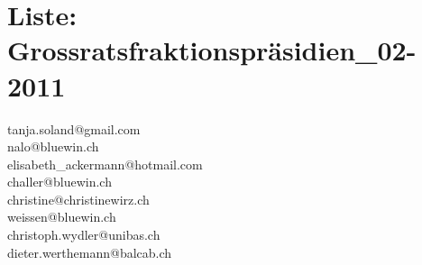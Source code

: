 \documentclass{scrartcl}
\begin{document}
\section*{Liste: Grossratsfraktionspräsidien_02-2011}
\textbf{} tanja.soland@gmail.com\\
\textbf{} nalo@bluewin.ch\\
\textbf{} elisabeth_ackermann@hotmail.com\\
\textbf{} challer@bluewin.ch\\
\textbf{} christine@christinewirz.ch\\
\textbf{} weissen@bluewin.ch\\
\textbf{} christoph.wydler@unibas.ch\\
\textbf{} dieter.werthemann@balcab.ch\\
\end{document}
